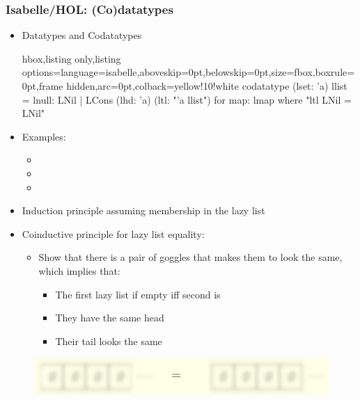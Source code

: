\documentclass[aspectratio=169,10pt]{beamer}
\begin{document}
\begin{frame}[fragile]
  \frametitle{Isabelle/HOL: (Co)datatypes}
  \begin{itemize}
    \item Datatypes and Codatatypes
          \begin{tcblisting}{hbox,listing only,listing options={language=isabelle,aboveskip=0pt,belowskip=0pt},size=fbox,boxrule=0pt,frame hidden,arc=0pt,colback=yellow!10!white}
            codatatype (lset: 'a) llist = lnull: LNil | LCons (lhd: 'a) (ltl: "'a llist")
            for map: lmap where "ltl LNil = LNil"
          \end{tcblisting}
    \item Examples:
          \begin{itemize}
            \item {}
            \item {}
            \item {}
          \end{itemize}
    \item Induction principle assuming membership in the lazy list
    \item Coinductive principle for lazy list equality:
          \begin{itemize}
            \item Show that there is a pair of goggles that makes them to look the same, which implies that:
                  \begin{itemize}
                    \item The first lazy list if empty iff second is
                    \item They have the same head
                    \item Their tail looks the same
                  \end{itemize}
          \end{itemize}
  \end{itemize}
  \begin{figure}
    \centering
    \includegraphics[scale=0.4]{equality_1.png}
  \end{figure}
\end{frame}
\end{document}
